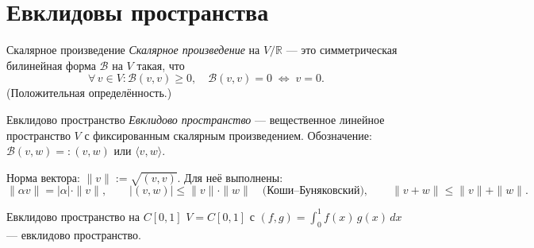 \section{Евклидовы пространства}

\begin{Definition}{Скалярное произведение}{}
	\textit{Скалярное произведение} на $V/\mathbb{R}$ — это симметрическая билинейная форма $\mathcal{B}$ на $V$ такая, что
	\[
	\forall\, v \in V\colon \mathcal{B}(v,v) \geq 0, \quad \mathcal{B}(v,v) = 0 \;\Longleftrightarrow\; v = 0.
	\] 
	(Положительная определённость.) 
\end{Definition}

\begin{Definition}{Евклидово пространство}{}
	\textit{Евклидово пространство} — вещественное линейное пространство $V$ с фиксированным скалярным произведением.
	Обозначение: $\mathcal{B}(v, w) =: (v, w)$ или $\langle v, w \rangle$.
\end{Definition}

Норма вектора: $\|v\| := \sqrt{(v,v)}$. Для неё выполнены:
\[
\|\alpha v\| = |\alpha|\cdot\|v\|, \qquad
|(v,w)| \leq \|v\|\cdot\|w\| \quad \text{(Коши--Буняковский)}, \qquad
\|v+w\| \leq \|v\| + \|w\|.
\] 

\begin{Example}{Евклидово пространство на $C[0,1]$}{}
	$V = C[0,1]$ с $(f,g) = \displaystyle\int_0^1 f(x)\,g(x)\,dx$ — евклидово пространство.
\end{Example}

